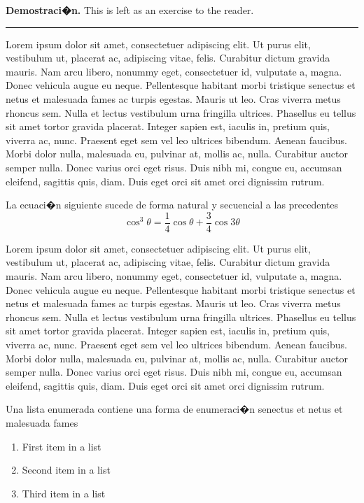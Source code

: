 \documentclass[10pt,twoside]{rcmart} %
\newenvironment{proof}[1][Demostraci�n]{\noindent\textbf{#1.} }{\ \rule{0.5em}{0.5em}}
\begin{document}
\begin{proof} 
	This is left as an exercise to the reader.
\end{proof}

Lorem ipsum dolor sit amet, consectetuer adipiscing elit. Ut purus elit, vestibulum ut, placerat ac, adipiscing vitae, felis. Curabitur dictum gravida mauris. Nam arcu libero, nonummy eget, consectetuer id, vulputate a, magna. Donec vehicula augue eu neque. Pellentesque habitant morbi tristique senectus et netus et malesuada fames ac turpis egestas. Mauris ut leo. Cras viverra metus rhoncus sem. Nulla et lectus vestibulum urna fringilla ultrices. Phasellus eu tellus sit amet tortor gravida placerat. Integer sapien est, iaculis in, pretium quis, viverra ac, nunc. Praesent eget sem vel leo ultrices bibendum. Aenean faucibus. Morbi dolor nulla, malesuada eu, pulvinar at, mollis ac, nulla. Curabitur auctor semper nulla. Donec varius orci eget risus. Duis nibh mi, congue eu, accumsan eleifend, sagittis quis, diam. Duis eget orci sit amet orci dignissim rutrum. 

La ecuaci�n siguiente sucede de forma natural y secuencial a las precedentes
\begin{equation}
\cos^3 \theta =\frac{1}{4}\cos\theta+\frac{3}{4}\cos 3\theta
\label{eq:refname2}
\end{equation}

Lorem ipsum dolor sit amet, consectetuer adipiscing elit. Ut purus elit, vestibulum ut, placerat ac, adipiscing vitae, felis. Curabitur dictum gravida mauris. Nam arcu libero, nonummy eget, consectetuer id, vulputate a, magna. Donec vehicula augue eu neque. Pellentesque habitant morbi tristique senectus et netus et malesuada fames ac turpis egestas. Mauris ut leo. Cras viverra metus rhoncus sem. Nulla et lectus vestibulum urna fringilla ultrices. Phasellus eu tellus sit amet tortor gravida placerat. Integer sapien est, iaculis in, pretium quis, viverra ac, nunc. Praesent eget sem vel leo ultrices bibendum. Aenean faucibus. Morbi dolor nulla, malesuada eu, pulvinar at, mollis ac, nulla. Curabitur auctor semper nulla. Donec varius orci eget risus. Duis nibh mi, congue eu, accumsan eleifend, sagittis quis, diam. Duis eget orci sit amet orci dignissim rutrum. %

Una lista enumerada contiene una forma de enumeraci�n senectus et netus et malesuada fames
\begin{enumerate} %
\item First item in a list
\item Second item in a list
\item Third item in a list
\end{enumerate}
\end{document}
